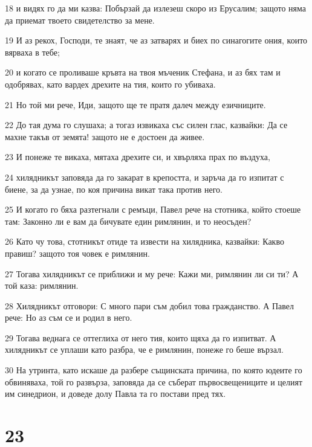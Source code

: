 \par 18 и видях го да ми казва: Побързай да излезеш скоро из Ерусалим; защото няма да приемат твоето свидетелство за мене.
\par 19 И аз рекох, Господи, те знаят, че аз затварях и биех по синагогите ония, които вярваха в тебе;
\par 20 и когато се проливаше кръвта на твоя мъченик Стефана, и аз бях там и одобрявах, като вардех дрехите на тия, които го убиваха.
\par 21 Но той ми рече, Иди, защото ще те пратя далеч между езичниците.
\par 22 До тая дума го слушаха; а тогаз извикаха със силен глас, казвайки: Да се махне такъв от земята! защото не е достоен да живее.
\par 23 И понеже те викаха, мятаха дрехите си, и хвърляха прах по въздуха,
\par 24 хилядникът заповяда да го закарат в крепостта, и заръча да го изпитат с биене, за да узнае, по коя причина викат така против него.
\par 25 И когато го бяха разтегнали с ремъци, Павел рече на стотника, който стоеше там: Законно ли е вам да бичувате един римлянин, и то неосъден?
\par 26 Като чу това, стотникът отиде та извести на хилядника, казвайки: Какво правиш? защото тоя човек е римлянин.
\par 27 Тогава хилядникът се приближи и му рече: Кажи ми, римлянин ли си ти? А той каза: римлянин.
\par 28 Хилядникът отговори: С много пари съм добил това гражданство. А Павел рече: Но аз съм се и родил в него.
\par 29 Тогава веднага се оттеглиха от него тия, които щяха да го изпитват. А хилядникът се уплаши като разбра, че е римлянин, понеже го беше вързал.
\par 30 На утринта, като искаше да разбере същинската причина, по която юдеите го обвиняваха, той го развърза, заповяда да се съберат първосвещениците и целият им синедрион, и доведе долу Павла та го постави пред тях.

\chapter{23}

